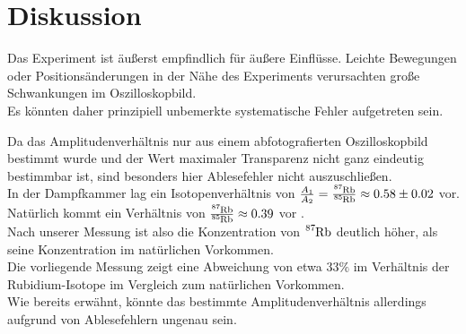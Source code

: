 \section{Diskussion}
\label{sec:Diskussion}
Das Experiment ist äußerst empfindlich für äußere Einflüsse. Leichte Bewegungen oder Positionsänderungen in der Nähe des Experiments verursachten große Schwankungen im Oszilloskopbild.\\
Es könnten daher prinzipiell unbemerkte systematische Fehler aufgetreten sein.

Da das Amplitudenverhältnis nur aus einem abfotografierten Oszilloskopbild bestimmt wurde und der Wert maximaler Transparenz nicht ganz eindeutig bestimmbar ist, sind besonders hier Ablesefehler nicht auszuschließen.\\
In der Dampfkammer lag ein Isotopenverhältnis von $\frac{A_1}{A_2}=\frac{\ce{^87Rb}}{\ce{^85Rb}}\approx 0.58\pm 0.02$ vor. Natürlich kommt ein Verhältnis von $\frac{\ce{^87Rb}}{\ce{^85Rb}}\approx 0.39$ vor \cite{muenster}.\\
Nach unserer Messung ist also die Konzentration von $\ce{^87Rb}$ deutlich höher, als seine Konzentration im natürlichen Vorkommen.\\
Die vorliegende Messung zeigt eine Abweichung von etwa $33\%$ im Verhältnis der Rubidium-Isotope im Vergleich zum natürlichen Vorkommen.\\
Wie bereits erwähnt, könnte das bestimmte Amplitudenverhältnis allerdings aufgrund von Ablesefehlern ungenau sein.

